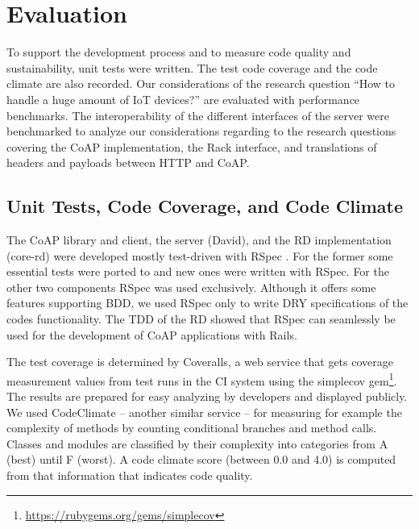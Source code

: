 \chapter{Evaluation}
\label{cha:evaluation}


To support the development process and to measure code quality and
sustainability, unit tests were written. The test code coverage and the code
climate are also recorded. Our considerations of the research question
\enquote{How to handle a huge amount of \ac{IoT} devices?} are evaluated with
performance benchmarks. The interoperability of the different interfaces of the
server were benchmarked to analyze our considerations regarding to the research
questions covering the \ac{CoAP} implementation, the Rack interface, and
translations of headers and payloads between \ac{HTTP} and \ac{CoAP}.

\section{Unit Tests, Code Coverage, and Code Climate}
	
	The \ac{CoAP} library and client, the server (David), and the \ac{RD}
	implementation (core-rd) were developed mostly test-driven with RSpec
	\cite{rspec}. For the former some essential tests were ported to and new
	ones were written with RSpec. For the other two components RSpec was used
	exclusively. Although it offers some features supporting \ac{BDD}, we used
	RSpec only to write \ac{DRY} specifications of the codes functionality. The
	\acl{TDD} of the \ac{RD} showed that RSpec can seamlessly be used for the
	development of \ac{CoAP} applications with \ac{Rails}.

	The test coverage is determined by Coveralls, a web service that gets
	coverage measurement values from test runs in the \ac{CI} system using the
	simplecov gem\footnote{\url{https://rubygems.org/gems/simplecov}}. The
	results are prepared for easy analyzing by developers and displayed
	publicly. We used CodeClimate -- another similar service -- for measuring
	for example the complexity of methods by counting conditional branches and
	method calls. Classes and modules are classified by their complexity into
	categories from A (best) until F (worst). A code climate score (between 0.0
	and 4.0) is computed from that information that indicates code quality.


